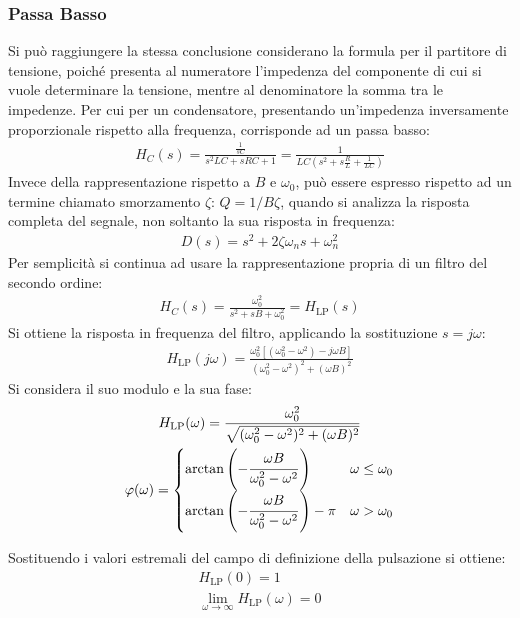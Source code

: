 \documentclass{article}
\numberwithin{equation}{subsection}
\begin{document}
\subsubsection{Passa Basso}

Si può raggiungere la stessa conclusione considerano la formula per il partitore di tensione, poiché presenta al numeratore l'impedenza del componente 
di cui si vuole determinare la tensione, mentre al denominatore la somma tra le impedenze.  
Per cui per un condensatore, presentando un'impedenza inversamente proporzionale rispetto alla frequenza, corrisponde ad un passa basso:
\begin{gather*}
    H_C(s)=\displaystyle\frac{\displaystyle\frac{1}{sC}}{s^2LC+sRC+1}=\frac{1}{LC\left(s^2+\displaystyle s\frac{R}{L}+\frac{1}{LC}\right)}
\end{gather*}
Invece della rappresentazione rispetto a $B$ e $\omega_0$, può essere espresso rispetto ad un termine chiamato smorzamento $\zeta$: $Q={1}/{B\zeta}$, quando si analizza la risposta completa 
del segnale, non soltanto la sua risposta in frequenza: 
\begin{gather*}
    D(s)=s^2+2\zeta\omega_n s+\omega_n^2
\end{gather*}
Per semplicità si continua ad usare la rappresentazione propria di un filtro del 
secondo ordine:
\begin{gather}
    H_C(s)=\displaystyle\frac{\omega_0^2}{s^2+sB+\omega_0^2}=H_{\mathrm{LP}}(s)
\end{gather}
Si ottiene la risposta in frequenza del filtro, applicando la sostituzione $s=j\omega$:
\begin{gather}
    H_{\mathrm{LP}}(j\omega)=\displaystyle\frac{\omega_0^2[(\omega_0^2-\omega^2)-j\omega B]}{(\omega_0^2-\omega^2)^2+(\omega B)^2}
\end{gather}
Si considera il suo modulo e la sua fase:
\begin{gather}
    H_{\mathrm{LP}}(\omega)=\displaystyle\frac{\omega_0^2}{\sqrt{(\omega_0^2-\omega^2)^2+(\omega B)^2}}\\
    \varphi(\omega)=\begin{cases}
        \arctan\left(\displaystyle-\frac{\strut \omega B}{\omega_0^2-\omega^2}\right)&\omega\leq\omega_0\\
        \arctan\left(\displaystyle-\frac{\strut \omega B}{\omega_0^2-\omega^2}\right)-\pi&\omega>\omega_0
    \end{cases}
\end{gather}

Sostituendo i valori estremali del campo di definizione della pulsazione si ottiene:
\begin{gather*}
    H_{\mathrm{LP}}(0)=1\\
    \lim_{\omega\to\infty}H_{\mathrm{LP}}(\omega)=0
\end{gather*}
\end{document}
